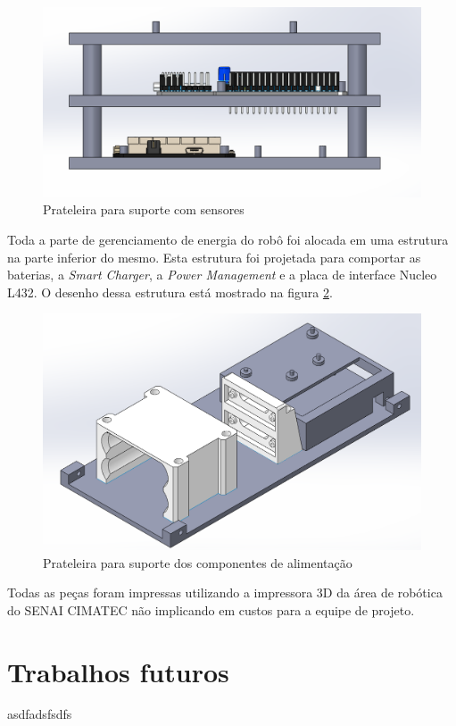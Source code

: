   \begin{figure}[h]
  	\centering
  	\includegraphics[width=16cm]{Figures/prateleiracsensores.png}
  	\caption{Prateleira para suporte com sensores} \label{Prateleiracsensor}
  \end{figure}
 

Toda a parte de gerenciamento de energia do robô foi alocada em uma estrutura na parte inferior do mesmo. Esta estrutura foi projetada para comportar as baterias, a \textit{Smart Charger}, a \textit{Power Management} e a placa de interface Nucleo L432. O desenho dessa estrutura está mostrado na figura \ref{pecaaliment}.

\begin{figure}[h]
	\centering
	\includegraphics[width=14cm]{Figures/pecadebaixo.png}
	\caption{Prateleira para suporte dos componentes de alimentação} \label{pecaaliment}
\end{figure}

Todas as peças foram impressas utilizando a impressora 3D da área de robótica do SENAI CIMATEC não implicando em custos para a equipe de projeto.


 
\section{Trabalhos futuros}
\label{sec:trabfut}
asdfadsfsdfs




